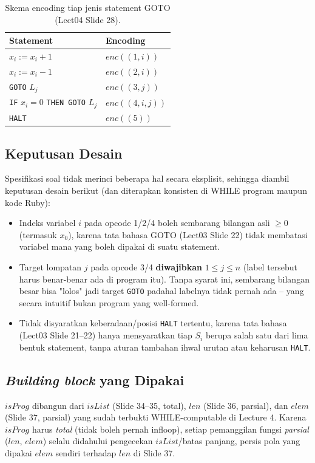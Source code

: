 \documentclass[12pt, a4paper, bahasa]{article}
\begin{document}
\begin{table}[H]
    \centering
    \begin{tabular}{ll}
        \hline
        Statement                                    & Encoding       \\ \hline
        $x_i:=x_i+1$                                 & $enc((1,i))$   \\
        $x_i:=x_i-1$                                 & $enc((2,i))$   \\
        \texttt{GOTO} $L_j$                          & $enc((3,j))$   \\
        \texttt{IF} $x_i=0$ \texttt{THEN GOTO} $L_j$ & $enc((4,i,j))$ \\
        \texttt{HALT}                                & $enc((5))$     \\ \hline
    \end{tabular}
    \caption{Skema encoding tiap jenis statement GOTO (Lect04 Slide 28).}
    \label{tab:opcode}
\end{table}

\subsection{Keputusan Desain}
Spesifikasi soal tidak merinci beberapa hal secara eksplisit, sehingga
diambil keputusan desain berikut (dan diterapkan konsisten di WHILE program
maupun kode Ruby):
\begin{itemize}
    \item Indeks variabel $i$ pada opcode 1/2/4 boleh sembarang bilangan
          asli $\geq0$ (termasuk $x_0$), karena tata bahasa GOTO (Lect03 Slide
          22) tidak membatasi variabel mana yang boleh dipakai di suatu
          statement.
    \item Target lompatan $j$ pada opcode 3/4 \textbf{diwajibkan}
          $1\leq j\leq n$ (label tersebut harus benar-benar ada di program itu).
          Tanpa syarat ini, sembarang bilangan besar bisa "lolos" jadi target
          \texttt{GOTO} padahal labelnya tidak pernah ada -- yang secara intuitif
          bukan program yang well-formed.
    \item Tidak disyaratkan keberadaan/posisi \texttt{HALT} tertentu,
          karena tata bahasa (Lect03 Slide 21--22) hanya mensyaratkan tiap $S_i$
          berupa salah satu dari lima bentuk statement, tanpa aturan tambahan
          ihwal urutan atau keharusan \texttt{HALT}.
\end{itemize}

\subsection{\textit{Building block} yang Dipakai}
$isProg$ dibangun dari $isList$ (Slide 34--35, total), $len$ (Slide 36,
parsial), dan $elem$ (Slide 37, parsial) yang sudah terbukti WHILE-computable
di Lecture 4. Karena $isProg$ harus \emph{total} (tidak boleh pernah
infloop), setiap pemanggilan fungsi \emph{parsial} ($len$, $elem$) selalu
didahului pengecekan $isList$/batas panjang, persis pola yang dipakai
$elem$ sendiri terhadap $len$ di Slide 37.
\end{document}
